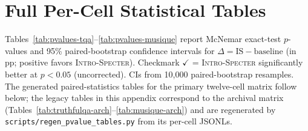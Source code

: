 \documentclass{article}
\newcommand{\method}{\textsc{Intro-Specter}\xspace}
\begin{document}
\section{Full Per-Cell Statistical Tables}\label{app:full-tables}
Tables~\ref{tab:pvalues-tqa}--\ref{tab:pvalues-musique} report McNemar exact-test $p$-values and 95\% paired-bootstrap confidence intervals for $\Delta = \text{IS} - \text{baseline}$ (in pp; positive favors \method). Checkmark $\checkmark$ = \method significantly better at $p{<}0.05$ (uncorrected). CIs from 10{,}000 paired-bootstrap resamples. The generated paired-statistics tables for the primary twelve-cell matrix follow below; the legacy tables in this appendix correspond to the archival matrix (Tables~\ref{tab:truthfulqa-arch}--\ref{tab:musique-arch}) and are regenerated by \texttt{scripts/regen\_pvalue\_tables.py} from its per-cell JSONLs.

\begin{table}[t]\centering\small
\caption{TruthfulQA: exact raw $p$, paired-bootstrap 95\% CI (pp), and paired $n$ in parentheses. $\ast$: Holm-adjusted $p<.05$ within the baseline family; sign of the CI determines direction.}
\label{tab:pvalues-tqa}
\setlength{\tabcolsep}{3pt}
\end{table}
\end{document}
